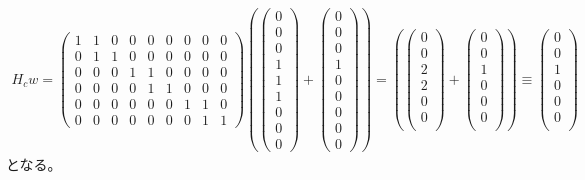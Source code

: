 \documentclass[]{ltjsarticle}
\begin{document}
\begin{align}
    H_c w 
    =    
    \begin{pmatrix}
        1 & 1 & 0 & 0 & 0 & 0 & 0 & 0 & 0 \\
        0 & 1 & 1 & 0 & 0 & 0 & 0 & 0 & 0 \\
        0 & 0 & 0 & 1 & 1 & 0 & 0 & 0 & 0 \\
        0 & 0 & 0 & 0 & 1 & 1 & 0 & 0 & 0 \\
        0 & 0 & 0 & 0 & 0 & 0 & 1 & 1 & 0 \\
        0 & 0 & 0 & 0 & 0 & 0 & 0 & 1 & 1
    \end{pmatrix}    
    \left(
        \begin{pmatrix}
            0 \\ 0 \\ 0 \\ 
            1 \\ 1 \\ 1 \\ 
            0 \\ 0 \\ 0
        \end{pmatrix}
        +
        \begin{pmatrix}
            0 \\ 0 \\ 0 \\ 
            1 \\ 0 \\ 0 \\ 
            0 \\ 0 \\ 0
        \end{pmatrix}
    \right)
    =
    \left(
        \begin{pmatrix}
            0 \\ 0 \\
            2 \\ 2 \\
            0 \\ 0 \\
        \end{pmatrix}
        +
        \begin{pmatrix}
            0 \\ 0 \\
            1 \\ 0 \\
            0 \\ 0 \\
        \end{pmatrix}
    \right)
    \equiv
    \begin{pmatrix}
        0 \\ 0 \\
        1 \\ 0 \\
        0 \\ 0 \\
    \end{pmatrix}
\end{align}
となる。
\end{document}
